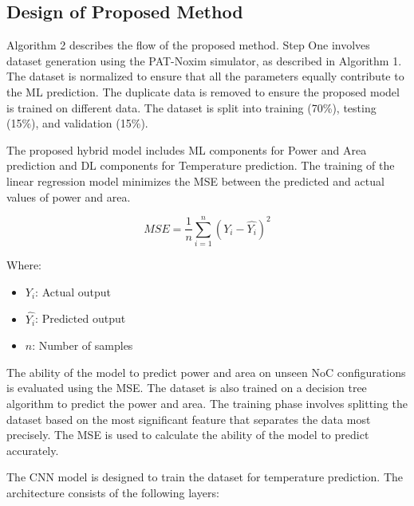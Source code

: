 \documentclass[conference]{IEEEtran}
\begin{document}
\subsection{Design of Proposed Method}
Algorithm 2 describes the flow of the proposed method. Step One involves dataset generation using the PAT-Noxim simulator, as described in Algorithm 1. The dataset is normalized to ensure that all the parameters equally contribute to the ML prediction. The duplicate data is removed to ensure the proposed model is trained on different data. The dataset is split into training (70\%), testing (15\%), and validation (15\%).

The proposed hybrid model includes ML components for Power and Area prediction and DL components for Temperature prediction. The training of the linear regression model minimizes the MSE between the predicted and actual values of power and area. 

\[
MSE = \frac{1}{n} \sum_{i=1}^{n} \left( Y_i - \hat{Y_i} \right)^2
\]

Where:
\begin{itemize}
    \item \( Y_i \): Actual output
    \item \( \hat{Y_i} \): Predicted output
    \item \( n \): Number of samples
\end{itemize}
The ability of the model to predict power and area on unseen NoC configurations is evaluated using the MSE.
The dataset is also trained on a decision tree algorithm to predict the power and area. The training phase involves splitting the dataset based on the most significant feature that separates the data most precisely. The MSE is used to calculate the ability of the model to predict accurately. 

The CNN model is designed to train the dataset for temperature prediction. The architecture consists of the following layers:
\end{document}

